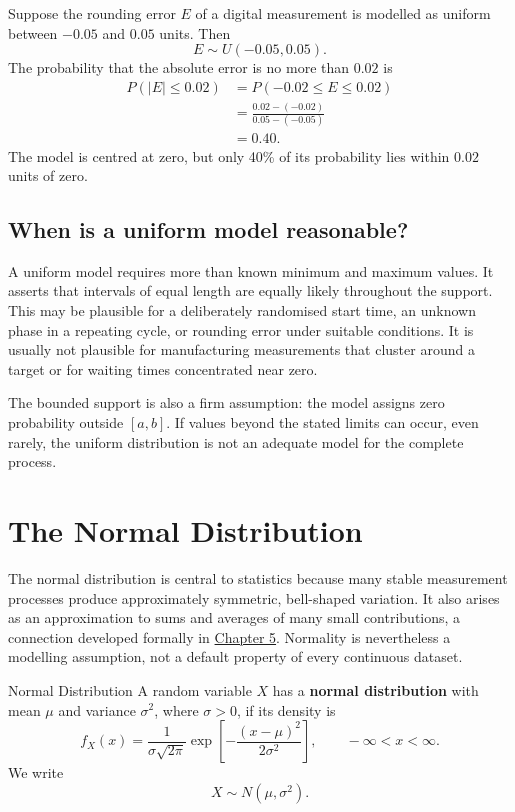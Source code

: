 \begin{example}\par
Suppose the rounding error $E$ of a digital measurement is modelled as uniform between $-0.05$ and $0.05$ units. Then
\[
    E\sim U(-0.05,0.05).
\]
The probability that the absolute error is no more than $0.02$ is
\[
\begin{aligned}
P(|E|\leq0.02)
  &=P(-0.02\leq E\leq0.02)\\
  &=\frac{0.02-(-0.02)}{0.05-(-0.05)}\\
  &=0.40.
\end{aligned}
\]
The model is centred at zero, but only 40\% of its probability lies within $0.02$ units of zero.
\end{example}

\subsection{When is a uniform model reasonable?}

A uniform model requires more than known minimum and maximum values. It asserts that intervals of equal length are equally likely throughout the support. This may be plausible for a deliberately randomised start time, an unknown phase in a repeating cycle, or rounding error under suitable conditions. It is usually not plausible for manufacturing measurements that cluster around a target or for waiting times concentrated near zero.

The bounded support is also a firm assumption: the model assigns zero probability outside $[a,b]$. If values beyond the stated limits can occur, even rarely, the uniform distribution is not an adequate model for the complete process.

\section{The Normal Distribution}
\label{sec:normal-distribution}

The normal distribution is central to statistics because many stable measurement processes produce approximately symmetric, bell-shaped variation. It also arises as an approximation to sums and averages of many small contributions, a connection developed formally in \hyperref[ch:sampling-distributions]{Chapter 5}. Normality is nevertheless a modelling assumption, not a default property of every continuous dataset.

\begin{definition}{Normal Distribution}
A random variable $X$ has a \textbf{normal distribution} with mean $\mu$ and variance $\sigma^2$, where $\sigma>0$, if its density is
\[
    f_X(x)=\frac{1}{\sigma\sqrt{2\pi}}
    \exp\!\left[-\frac{(x-\mu)^2}{2\sigma^2}\right],
    \qquad -\infty<x<\infty.
\]
We write
\[
    X\sim N(\mu,\sigma^2).
\]
\end{definition}

